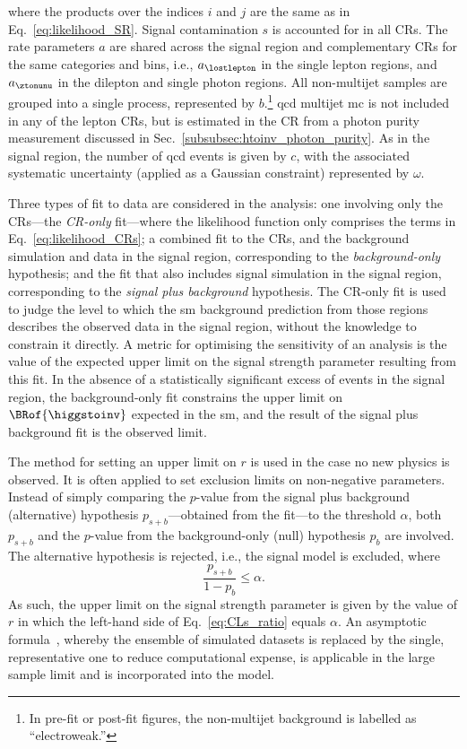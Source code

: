 where the products over the indices $i$ and $j$ are the same as in Eq.~\ref{eq:likelihood_SR}. Signal contamination $s$ is accounted for in all \glspl{CR}. The rate parameters $a$ are shared across the signal region and complementary \glspl{CR} for the same categories and \ptmiss bins, i.e., $a_{\lostlepton}$ in the single lepton regions, and $a_{\ztonunu}$ in the dilepton and single photon regions. All non-multijet samples are grouped into a single process, represented by $b$.\footnote{In pre-fit or post-fit figures, the non-multijet background is labelled as ``electroweak.''} \acrshort{qcd} multijet \acrshort{mc} is not included in any of the lepton \glspl{CR}, but is estimated in the \singlePhotonCr \gls{CR} from a photon purity measurement discussed in Sec.~\ref{subsubsec:htoinv_photon_purity}. As in the signal region, the number of \acrshort{qcd} events is given by $c$, with the associated systematic uncertainty (applied as a Gaussian constraint) represented by $\omega$.

Three types of fit to data are considered in the analysis: one involving only the \glspl{CR}---the \emph{\gls{CR}-only} fit---where the likelihood function only comprises the terms in Eq.~\ref{eq:likelihood_CRs}; a combined fit to the \glspl{CR}, and the background simulation and data in the signal region, corresponding to the \emph{background-only} hypothesis; and the fit that also includes signal simulation in the signal region, corresponding to the \emph{signal plus background} hypothesis. The \gls{CR}-only fit is used to judge the level to which the \acrshort{sm} background prediction from those regions describes the observed data in the signal region, without the knowledge to constrain it directly. A metric for optimising the sensitivity of an analysis is the value of the expected upper limit on the signal strength parameter resulting from this fit. In the absence of a statistically significant excess of events in the signal region, the background-only fit constrains the upper limit on $\BRof{\higgstoinv}$ expected in the \acrshort{sm}, and the result of the signal plus background fit is the observed limit.

The \CLs method for setting an upper limit on $r$ is used in the case no new physics is observed. It is often applied to set exclusion limits on non-negative parameters. Instead of simply comparing the $p$-value from the signal plus background (alternative) hypothesis $p_{s+b}$---obtained from the fit---to the threshold $\alpha$, both $p_{s+b}$ and the $p$-value from the background-only (null) hypothesis $p_b$ are involved. The alternative hypothesis is rejected, i.e., the signal model is excluded, where
\begin{equation}
    \frac{p_{s+b}}{1 - p_b} \leq \alpha.
    \label{eq:CLs_ratio}
\end{equation}
As such, the upper limit on the signal strength parameter is given by the value of $r$ in which the left-hand side of Eq.~\ref{eq:CLs_ratio} equals $\alpha$. An asymptotic formula~\cite{Cowan:2010js}, whereby the ensemble of simulated datasets is replaced by the single, representative one to reduce computational expense, is applicable in the large sample limit and is incorporated into the model.

